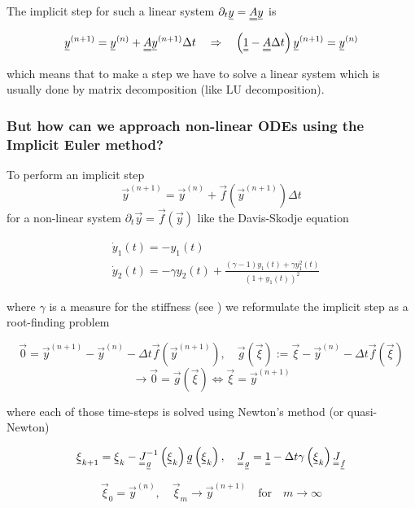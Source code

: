 The implicit step for such a linear system $\partial_t \vec{y} = \mat{A} \vec{y}$ is

\[
  \vec{y}^{(n+1)} = \vec{y}^{(n)} + \mat{A} \vec{y}^{(n+1)} \Delta t \quad \Rightarrow \quad \left( \mat{1} - \mat{A} \Delta t \right) \vec{y}^{(n+1)} = \vec{y}^{(n)}
\]

which means that to make a step we have to solve a linear system which is usually done by matrix decomposition (like LU decomposition).

\subsubsection{But how can we approach non-linear ODEs using the Implicit Euler method?}
\label{sssec:implicit_euler_nonlinear}
To perform an implicit step 
\[
  \vec{y}^{(n+1)} = \vec{y}^{(n)} + \vec{f} \left( \vec{y}^{(n+1)} \right) \Delta t
\]
for a non-linear system $\partial_t \vec{y} = \vec{f} \left( \vec{y} \right)$ like the Davis-Skodje equation

\[ 
\begin{aligned}
& \dot{y}_1(t)=-y_1(t) \\
& \dot{y}_2(t)=-\gamma y_2(t)+\frac{(\gamma-1) y_1(t)+\gamma y_1^2(t)}{\left(1+y_1(t)\right)^2}
\end{aligned}
\]

where $\gamma$ is a measure for the stiffness (see \cite[chapter 2.4]{heiter12}) we reformulate the implicit step as a root-finding problem

\[
  \vec{0} = \vec{y}^{(n+1)} - \vec{y}^{(n)} - \Delta t \vec{f} \left( \vec{y}^{(n+1)} \right), \quad \vec{g} \left( \vec{\xi} \right) := \vec{\xi} - \vec{y}^{(n)} - \Delta t \vec{f} \left( \vec{\xi} \right)
\]
\[
  \rightarrow \vec{0} = \vec{g} \left( \vec{\xi} \right) \Leftrightarrow \vec{\xi} = \vec{y}^{(n+1)}
\]

where each of those time-steps is solved using Newton's method (or quasi-Newton)


\[
  \vec{\xi}_{k+1} = \vec{\xi}_k - \mat{J}_{\vec{g}}^{-1} \left( \vec{\xi}_k \right) \vec{g} \left( \vec{\xi}_k \right), \quad \mat{J}_{\vec{g}} = \mat{1} - \Delta t \gamma \left( \vec{\xi}_k \right) \mat{J}_{\vec{f}}
\]

\[
  \vec{\xi}_0 = \vec{y}^{(n)}, \quad \vec{\xi}_m \rightarrow \vec{y}^{(n+1)} \quad \text{for} \quad m \rightarrow \infty
\]
  
